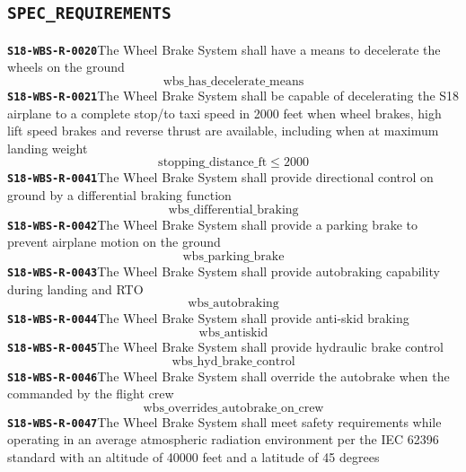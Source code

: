\documentclass[11pt,a4paper]{article}
\begin{document}
\subsection*{\texttt{SPEC\_REQUIREMENTS}}
\noindent\textbf{\texttt{S18-WBS-R-0020}}\quad The Wheel Brake System shall have a means to decelerate the wheels on the ground
\begin{dmath*}
\text{wbs\_has\_decelerate\_means}
\end{dmath*}
\noindent\textbf{\texttt{S18-WBS-R-0021}}\quad The Wheel Brake System shall be capable of decelerating the S18 airplane to a complete stop/to taxi speed in 2000 feet when wheel brakes, high lift speed brakes and reverse thrust are available, including when at maximum landing weight
\begin{dmath*}
\text{stopping\_distance\_ft} \leq 2000
\end{dmath*}
\noindent\textbf{\texttt{S18-WBS-R-0041}}\quad The Wheel Brake System shall provide directional control on ground by a differential braking function
\begin{dmath*}
\text{wbs\_differential\_braking}
\end{dmath*}
\noindent\textbf{\texttt{S18-WBS-R-0042}}\quad The Wheel Brake System shall provide a parking brake to prevent airplane motion on the ground
\begin{dmath*}
\text{wbs\_parking\_brake}
\end{dmath*}
\noindent\textbf{\texttt{S18-WBS-R-0043}}\quad The Wheel Brake System shall provide autobraking capability during landing and RTO
\begin{dmath*}
\text{wbs\_autobraking}
\end{dmath*}
\noindent\textbf{\texttt{S18-WBS-R-0044}}\quad The Wheel Brake System shall provide anti-skid braking
\begin{dmath*}
\text{wbs\_antiskid}
\end{dmath*}
\noindent\textbf{\texttt{S18-WBS-R-0045}}\quad The Wheel Brake System shall provide hydraulic brake control
\begin{dmath*}
\text{wbs\_hyd\_brake\_control}
\end{dmath*}
\noindent\textbf{\texttt{S18-WBS-R-0046}}\quad The Wheel Brake System shall override the autobrake when the commanded by the flight crew
\begin{dmath*}
\text{wbs\_overrides\_autobrake\_on\_crew}
\end{dmath*}
\noindent\textbf{\texttt{S18-WBS-R-0047}}\quad The Wheel Brake System shall meet safety requirements while operating in an average atmospheric radiation environment per the IEC 62396 standard with an altitude of 40000 feet and a latitude of 45 degrees
\end{document}

